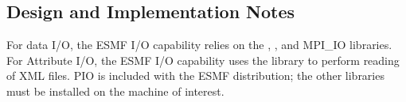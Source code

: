 
\subsection{Design and Implementation Notes}

For data I/O, the ESMF I/O capability relies on the
, 
, 
and MPI\_IO libraries.  For Attribute I/O, the ESMF I/O capability uses the
 library to 
perform reading of XML files.  PIO is included with the ESMF distribution; 
the other libraries must be installed on the machine of interest.
